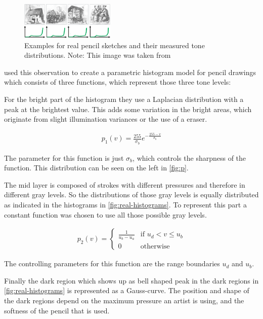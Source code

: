 \begin{figure}[htb]
  \centering
  \includegraphics[width=0.4\textwidth]{images/real-histograms.png}
  \caption{Examples for real pencil sketches and their measured tone
    distributions. Note: This image was taken from \cite{mainPaper}}
  \label{fig:real-histograms}
\end{figure}

\cite{mainPaper} used this observation to create a parametric histogram model
for pencil drawings which consists of three functions, which represent those
three tone levels:

For the bright part of the histogram they use a Laplacian distribution with a
peak at the brightest value. This adds some variation in the bright areas, which
originate from slight illumination variances or the use of a eraser.

\begin{align}
  p_1(v) = \frac{255}{\sigma_b} e ^{-\frac{255-v}{\sigma_b}} \label{eq:p_1}
\end{align}

The parameter for this function is just $\sigma_b$, which controls the sharpness of
the function. This distribution can be seen on the left 
in \autoref{fig:p}.

The mid layer is composed of strokes with different pressures and therefore in
different gray levels. So the distributions of those gray levels is equally
distributed as indicated in the histograms in \autoref{fig:real-histograms}. To
represent this part a constant function was chosen to use all those possible
gray levels.

\begin{align}
  p_2(v) = \begin{cases} \frac{1}{u_b - u_a} & \text{if } u_d < v \leq u_b\\
    0 & \text{otherwise}
  \end{cases} \label{eq:p_2}
\end{align}

The controlling parameters for this function are the range boundaries $u_d$
and $u_b$.

Finally the dark region which shows up as bell shaped peak in the dark
regions in \autoref{fig:real-histograms} is represented as a Gauss-curve. The
position and shape of the dark regions depend on the maximum pressure an artist is using,
and the softness of the pencil that is used.

